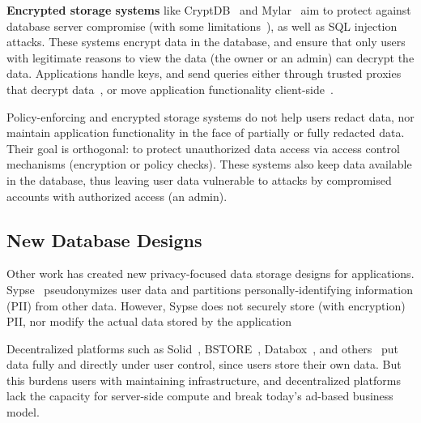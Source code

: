 \textbf{Encrypted storage systems} like
CryptDB~\cite{cryptdb} and
Mylar~\cite{mylar} aim to protect against database server compromise (with some
limitations~\cite{grubbs}), as well as SQL injection attacks.
%
These systems encrypt data in the database, and ensure that only
users with legitimate reasons to view the data (\ie the owner or an
admin) can decrypt the data.
%
Applications handle keys, and send queries either through
trusted proxies that decrypt data~\cite{cryptdb}, or move application
functionality client-side~\cite{mylar}.
%

Policy-enforcing and encrypted storage systems do not help users redact data,
nor maintain application functionality in the face of partially or fully
redacted data. 
%
Their goal is orthogonal: to protect unauthorized data access via access control
mechanisms (encryption or policy checks).
%
These systems also keep data available in the database, thus leaving user data
vulnerable to attacks by compromised accounts with authorized access (\eg an
admin).

%
\subsection{New Database Designs}
Other work has created new privacy-focused data storage designs for applications.
Sypse~\cite{sypse} pseudonymizes user data and partitions personally-identifying
information (PII) from other data.
%
%
However, Sypse does not securely store (\eg with encryption) PII, nor modify the
actual data stored by the application

%
Decentralized platforms such as Solid~\cite{solid}, BSTORE~\cite{bstore},
Databox~\cite{databox}, and others~\cite{diy, amber, oort, w5, blockstack} put
data fully and directly under user control, since users store their own data.
%
But this burdens users with maintaining infrastructure, and decentralized platforms
lack the capacity for server-side compute and break today's ad-based
business model.
%
